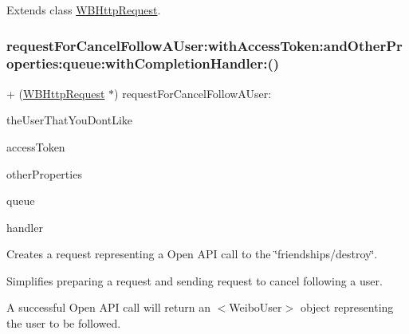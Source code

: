 Extends class \mbox{\hyperlink{interface_w_b_http_request_a0a601918d65f1776f99882facc1349e3}{W\+B\+Http\+Request}}.

\mbox{\label{category_w_b_http_request_07_weibo_user_08_a0a601918d65f1776f99882facc1349e3}} 
\subsubsection{\texorpdfstring{request\+For\+Cancel\+Follow\+A\+User\+:with\+Access\+Token\+:and\+Other\+Properties\+:queue\+:with\+Completion\+Handler\+:()}{requestForCancelFollowAUser:withAccessToken:andOtherProperties:queue:withCompletionHandler:()}\hspace{0.1cm}{\footnotesize\ttfamily [3/3]}}
{\footnotesize\ttfamily + (\mbox{\hyperlink{interface_w_b_http_request}{W\+B\+Http\+Request}} $\ast$) request\+For\+Cancel\+Follow\+A\+User\+: \begin{DoxyParamCaption}\item[{(N\+S\+String $\ast$)}]{the\+User\+That\+You\+Dont\+Like }\item[{withAccessToken:(N\+S\+String $\ast$)}]{access\+Token }\item[{andOtherProperties:(N\+S\+Dictionary $\ast$)}]{other\+Properties }\item[{queue:(N\+S\+Operation\+Queue $\ast$)}]{queue }\item[{withCompletionHandler:(W\+B\+Request\+Handler)}]{handler }\end{DoxyParamCaption}}

Creates a request representing a Open A\+PI call to the \char`\"{}friendships/destroy\char`\"{}.

Simplifies preparing a request and sending request to cancel following a user.

A successful Open A\+PI call will return an $<$\+Weibo\+User$>$ object representing the user to be followed.

